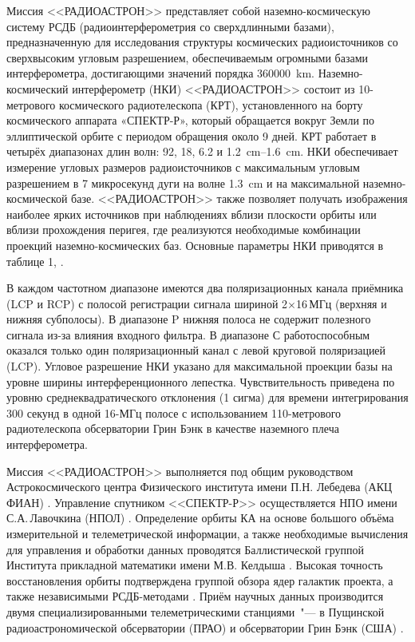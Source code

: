 Миссия <<РАДИОАСТРОН>> представляет собой наземно-космическую систему РСДБ (радиоинтерферометрия со
сверхдлинными базами), предназначенную для исследования структуры космических радиоисточников со
сверхвысоким угловым разрешением, обеспечиваемым огромными базами интерферометра, достигающими
значений порядка \SI{360000}{\km}. Наземно-космический интерферометр (НКИ) <<РАДИОАСТРОН>> состоит
из 10-метрового космического радиотелескопа (КРТ), установленного на борту космического аппарата
«СПЕКТР-Р», который обращается вокруг Земли по эллиптической орбите с периодом обращения около 9
дней. КРТ работает в четырёх диапазонах длин волн: 92, 18, 6.2 и \SIrange{1.2}{1.6}{\cm}. НКИ
обеспечивает измерение угловых размеров радиоисточников с максимальным угловым разрешением в 7
микросекунд дуги на волне \SI{1.3}{\cm} и на максимальной наземно-космической базе. <<РАДИОАСТРОН>>
также позволяет получать изображения наиболее ярких источников при наблюдениях вблизи плоскости
орбиты или вблизи прохождения перигея, где реализуются необходимые комбинации проекций
наземно-космических баз. Основные параметры НКИ приводятся в таблице 1,
\cite{Kardashev_2013_rus,Kovalev_2014_rus}.

В каждом частотном диапазоне имеются два поляризационных канала приёмника (LCP и RCP) с полосой
регистрации сигнала шириной 2$\times$16\,МГц (верхняя и нижняя субполосы). В диапазоне P нижняя
полоса не содержит полезного сигнала из-за влияния входного фильтра. В диапазоне С работоспособным
оказался только один поляризационный канал с левой круговой поляризацией (LCP). Угловое разрешение
НКИ указано для максимальной проекции базы на уровне ширины интерференционного лепестка.
Чувствительность приведена по уровню среднеквадратического отклонения (1 сигма) для времени
интегрирования 300 секунд в одной 16-МГц полосе с использованием 110-метрового радиотелескопа
обсерватории Грин Бэнк в качестве наземного плеча интерферометра.

Миссия <<РАДИОАСТРОН>> выполняется под общим руководством Астрокосмического центра Физического
института имени П.Н. Лебедева (АКЦ ФИАН) \cite{Kardashev_2013_rus,Burgin_2015}. Управление спутником
<<СПЕКТР-Р>> осуществляется НПО имени С.А.\,Лавочкина (НПОЛ) \cite{Khartov_2014}. Определение орбиты
КА на основе большого объёма измерительной и телеметрической информации, а также необходимые
вычисления для управления и обработки данных проводятся Баллистической группой Института прикладной
математики имени М.В. Келдыша \cite{Zakhvatkin_2014,Zaslavsky_2014}. Высокая точность восстановления
орбиты подтверждена группой обзора ядер галактик проекта, а также независимыми РСДБ-методами
\cite{Duev_2015}. Приём научных данных производится двумя специализированными телеметрическими
станциями~"--- в Пущинской радиоастрономической обсерватории (ПРАО) \cite{Kanevsky_2014} и
обсерватории Грин Бэнк (США) \cite{Ford_2014}.


